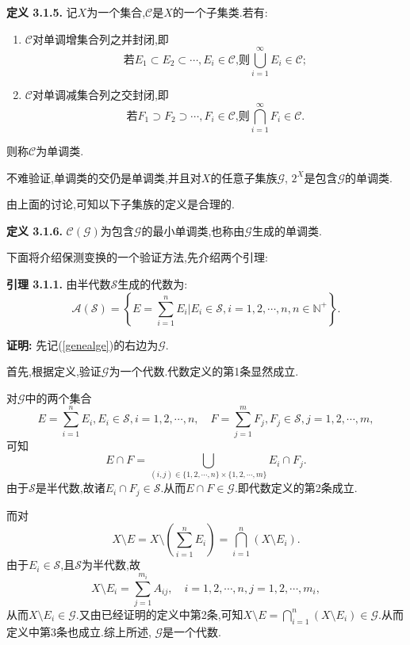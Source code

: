 \par
\textbf{定义 3.1.5.  }
记$X$为一个集合,$\mathcal{C}$是$X$的一个子集类.若有:
\begin{enumerate}
    \item $\mathcal{C}$对单调增集合列之并封闭,即
          $$\text{若}E_{1}\subset E_{2}\subset\cdots,E_{i}\in{\mathcal C}\text{,则}\bigcup_{i=1}^{\infty}E_{i}\in{\mathcal C};$$
    \item $\mathcal{C}$对单调减集合列之交封闭,即
          $$\text{若}F_{1}\supset F_{2}\supset\cdots,F_{i}\in{\mathcal C}\text{,则}\bigcap_{i=1}^{\infty}F_{i}\in{\mathcal C}.$$
\end{enumerate}
则称$\mathcal{C}$为单调类.
\par
不难验证,单调类的交仍是单调类,并且对$X$的任意子集族$\mathcal{G}$, $2^X$是包含$\mathcal{G}$的单调类.\par
由上面的讨论,可知以下子集族的定义是合理的.\par
\textbf{定义 3.1.6.  }$\mathcal{C}(\mathcal{G})$为包含$\mathcal{G}$的最小单调类,也称由$\mathcal{G}$生成的单调类.
\par
下面将介绍保测变换的一个验证方法,先介绍两个引理:\par
\textbf{引理 3.1.1.  }\textsuperscript{\cite{Ergodic_Sun,Ergodic_theory}}
由半代数$\mathcal{S}$生成的代数为:
\begin{equation}\label{genealge}
    {\mathcal A}({\mathcal S})=\left\{E=\sum\limits_{i=1}^{n}E_{i}|E_{i}\in{\mathcal S},i=1,2,\cdots,n,n\in\mathbb{N^{+}}\right\}.
\end{equation}
\par
\textbf{证明:  }
先记(\ref{genealge})的右边为$\mathcal{G}$.\par
首先,根据定义,验证$\mathcal{G}$为一个代数.代数定义的第1条显然成立.\par
对$\mathcal{G}$中的两个集合
$$E=\sum\limits_{i=1}^{n}E_{i},E_{i}\in{\mathcal S},i=1,2,\cdots,n,\quad F=\sum\limits_{j=1}^{m}F_{j},F_{j}\in{\mathcal S},j=1,2,\cdots,m,$$
可知
$$E\cap F=\bigcup\limits_{(i,j)\in\{1,2,\cdots,n\}\times\{1,2,\cdots,m\}}E_i\cap F_j.$$
由于$\mathcal{S}$是半代数,故诸$E_i\cap F_j\in\mathcal{S}$.从而$E\cap F\in \mathcal{G}.$即代数定义的第2条成立.\par
而对
$$X\setminus E=X\setminus(\sum\limits_{i=1}^n E_i)=\bigcap\limits_{i=1}^n (X\setminus E_i).$$
由于$E_i \in \mathcal{S}$,且$\mathcal{S}$为半代数,故
$$X\setminus{E_i}=\sum\limits_{j=1}^{m_i}A_{ij},\quad i=1,2,\cdots,n,j=1,2,\cdots,m_i,$$
从而$X\setminus E_i\in \mathcal{G}$.又由已经证明的定义中第2条,可知$X\setminus E=\bigcap\limits_{i=1}^n (X\setminus E_i)\in \mathcal{G}$.从而定义中第3条也成立.综上所述, $\mathcal{G}$是一个代数.\par
